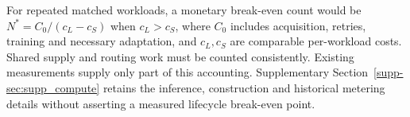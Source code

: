 For repeated matched workloads, a monetary break-even count would be $N^*=C_0/(c_L-c_S)$ when $c_L>c_S$, where $C_0$ includes acquisition, retries, training and necessary adaptation, and $c_L,c_S$ are comparable per-workload costs. Shared supply and routing work must be counted consistently. Existing measurements supply only part of this accounting. Supplementary Section~\ref{supp-sec:supp_compute} retains the inference, construction and historical metering details without asserting a measured lifecycle break-even point.

